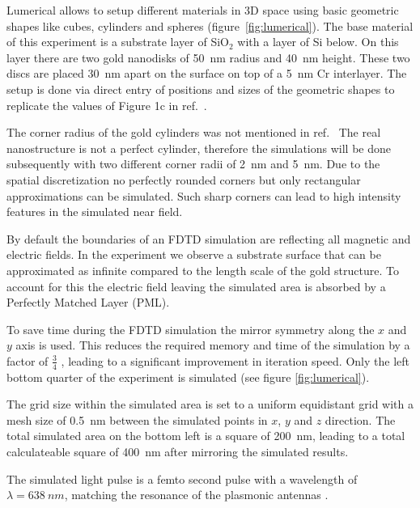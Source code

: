 Lumerical allows to setup different materials in 3D space using basic geometric shapes like cubes, cylinders and spheres (figure~\ref{fig:lumerical}). The base material of this experiment is a substrate layer of SiO$_2$ with a layer of Si below. On this layer there are two gold nanodisks of \SI{50}{nm} radius and \SI{40}{nm} height. These two discs are placed \SI{30}{nm} apart on the surface on top of a \SI{5}{nm} Cr interlayer. The setup is done via direct entry of positions and sizes of the geometric shapes to replicate the values of Figure 1c in ref.~\cite{heeg}.

The corner radius of the gold cylinders was not mentioned in ref.~\cite{heeg} The real nanostructure is not a perfect cylinder, therefore the simulations will be done subsequently with two different corner radii of \SI{2}{nm} and \SI{5}{nm}. Due to the spatial discretization no perfectly rounded corners but only rectangular approximations can be simulated. Such sharp corners can lead to high intensity features in the simulated near field.

By default the boundaries of an FDTD simulation are reflecting all magnetic and electric fields. In the experiment we observe a substrate surface that can be approximated as infinite compared to the length scale of the gold structure. To account for this the electric field leaving the simulated area is absorbed by a Perfectly Matched Layer (PML).

To save time during the FDTD simulation the mirror symmetry along the $x$ and $y$ axis is used. This reduces the required memory and time of the simulation by a factor of $\frac{3}{4}$ , leading to a significant improvement in iteration speed. Only the left bottom quarter of the experiment is simulated (see figure \ref{fig:lumerical}).

The grid size within the simulated area is set to a uniform equidistant grid with a mesh size of \SI{0.5}{nm} between the simulated points in $x$, $y$ and $z$ direction. The total simulated area on the bottom left is a square of \SI{200}{nm}, leading to a total calculateable square of \SI{400}{nm} after mirroring the simulated results. 

The simulated light pulse is a femto second pulse with a wavelength of $\lambda=\SI{638}{nm}$, matching the resonance of the plasmonic antennas \cite{heeg}.

